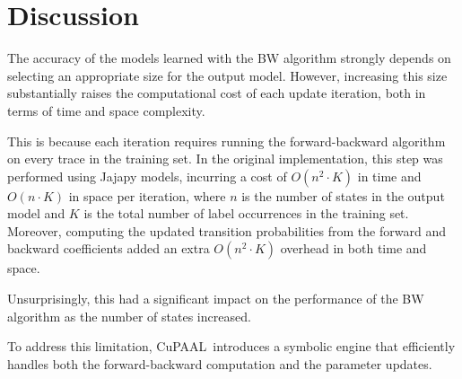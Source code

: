 \section{Discussion}\label{sec:discussion}

The accuracy of the models learned with the BW algorithm strongly depends on selecting an appropriate size for the output model. However, increasing this size substantially raises the computational cost of each update iteration, both in terms of time and space complexity.

This is because each iteration requires running the forward-backward algorithm on every trace in the training set. In the original implementation, this step was performed using Jajapy models, incurring a cost of $O(n^2 \cdot K)$ in time and $O(n \cdot K)$ in space per iteration, where $n$ is the number of states in the output model and $K$ is the total number of label occurrences in the training set. Moreover, computing the updated transition probabilities from the forward and backward coefficients added an extra $O(n^2 \cdot K)$ overhead in both time and space.

Unsurprisingly, this had a significant impact on the performance of the BW algorithm as the number of states increased.

To address this limitation, CuPAAL\ introduces a symbolic engine that efficiently handles both the forward-backward computation and the parameter updates.